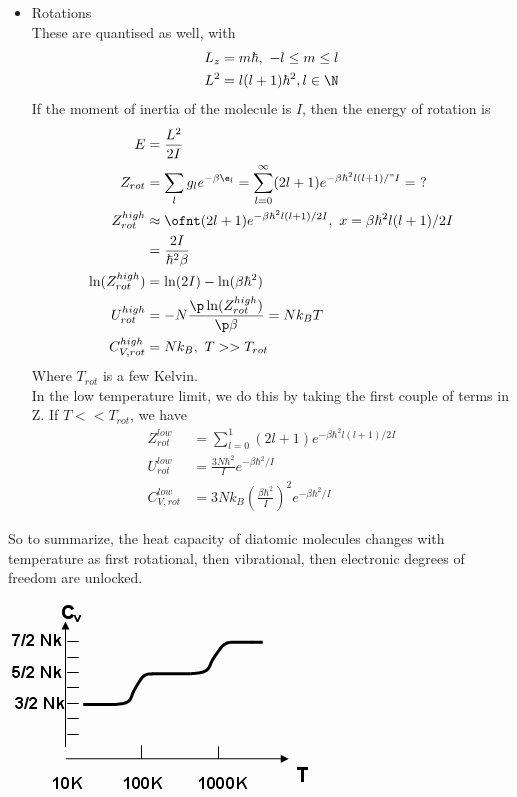 \documentclass[a4paper, 11pt, normalem]{report}
\begin{document}
\begin{example}[Ctd]
\begin{itemize}
        \item Rotations \\
            These are quantised as well, with
            \begin{align}
                L_z &= m\hbar,~ -l \leq m \leq l \\
                L^2 &= l(l+1)\hbar^2, l \in \N
            \end{align}
            If the moment of inertia of the molecule is $I$, then the energy of rotation is 
            \begin{align}
                E &= \frac{L^2}{2I} \\
                Z_{rot} &= \sum_l g_l e^{-\beta\e_l} = \sum_{l=0}^\infty (2l+1) e^{-\beta\hbar^2l(l+1)/"I} = ~? \\
                Z_{rot}^{high} &\approx \ofnt (2l+1)e^{-\beta\hbar^2l(l+1)/2I},~ x = \beta\hbar^2l(l+1)/2I \\
                               &= \frac{2I}{\hbar^2\beta} \\
                \ln(Z_{rot}^{high}) &= \ln(2I) - \ln(\beta\hbar^2) \\
                U_{rot}^{high} &= -N\frac{\p\ln(Z_{rot}^{high})}{\p\beta} = Nk_BT \\
                C_{V,rot}^{high} &= Nk_B,~ T >> T_{rot}
            \end{align}
            Where $T_{rot}$ is a few Kelvin. \\
            In the low temperature limit, we do this by taking the first couple of terms in Z. 
            If $T << T_{rot}$, we have 
            \begin{align}
                Z_{rot}^{low} &= \sum_{l=0}^1 (2l+1)e^{-\beta\hbar^2l(l+1)/2I} \\
                U_{rot}^{low} &= \frac{3N\hbar^2}{I}e^{-\beta\hbar^2/I} \\
                C_{V,rot}^{low} &= 3Nk_B\left(\frac{\beta\hbar^2}{I}\right)^2e^{-\beta\hbar^2/I}
            \end{align}
    \end{itemize}
    So to summarize, the heat capacity of diatomic molecules changes with temperature as first rotational, then vibrational, then electronic degrees of freedom are unlocked.
    \begin{center}
        \includegraphics[scale=0.8]{cv.png}
    \end{center}
\end{example}
\end{document}
